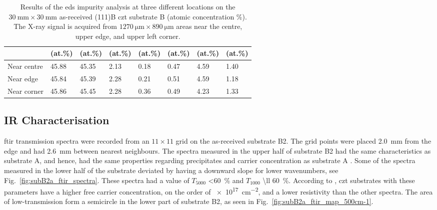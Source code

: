 \begin{table}[htbp]
    \centering
    \caption[\Ac{eds} impurity analysis of the as-received substrate B.]{Results of the \ac{eds} impurity analysis at three different locations on the $\SI{30}{\milli\metre}\times\SI{30}{\milli\metre}$ as-received (111)B \ac{czt} substrate B (atomic concentration \%). The X-ray signal is acquired from $\SI{1270}{\micro\metre}\times\SI{890}{\micro\metre}$ areas near the centre, upper edge, and upper left corner.}\label{tab:subBa_eds_analysis}
    \begin{tabu} to 1.0\textwidth { X[1.85,r] X[1.125,c] X[1.125,c] X[1.125,c] X[1.125,c] X[1.125,c] X[1.125,c] X[1.125,c] }
    \hline
         & \textbf{} (at.\%) & \textbf{} (at.\%) & \textbf{} (at.\%) & \textbf{ } (at.\%) & \textbf{} (at.\%) & \textbf{} (at.\%) & \textbf{} (at.\%) \\ %
        \hline
        Near centre & \SI{45.88}{} & \SI{45.35}{} & \SI{2.13}{} & \SI{0.18}{} & \SI{0.47}{} & \SI{4.59}{} & \SI{1.40}{}  \\ %
        Near edge & \SI{45.84}{} & \SI{45.39}{} & \SI{2.28}{} & \SI{0.21}{} & \SI{0.51}{} & \SI{4.59}{} & \SI{1.18}{}   \\ %
        Near corner & \SI{45.86}{} & \SI{45.45}{} & \SI{2.28}{} & \SI{0.36}{} & \SI{0.49}{} & \SI{4.23}{} & \SI{1.33}{}  \\ %
         \hline
    \end{tabu}
\end{table}
\subsection{IR Characterisation}

\Ac{ftir} transmission spectra were recorded from an $11\times11$ grid on the as-received substrate B2. The grid points were placed \SI{2.0}{\milli\metre} from the edge and had \SI{2.6}{\milli\metre} between nearest neighbours. The spectra measured in the upper half of substrate B2 had the same characteristics as substrate A, and hence, had the same properties regarding precipitates and carrier concentration as substrate A \citep{yujie2004infrared}. Some of the spectra measured in the lower half of the substrate deviated by having a downward slope for lower wavenumbers, see Fig.~\ref{fig:subB2a_ftir_spectra}. These spectra had a value of $T_{5000}$ \SI{<60}{\percent} and $T_{1000}$ \SI{\ll 60}{\percent}. According to \citet{yujie2004infrared}, \ac{czt} substrates with these parameters have a higher free carrier concentration, on the order of  \SI{e17}{\centi\metre^{-2}}, and a lower resistivity than the other spectra. The area of low-transmission form a semicircle in the lower part of substrate B2, as seen in Fig.~\ref{fig:subB2a_ftir_map_500cm-1}. %

